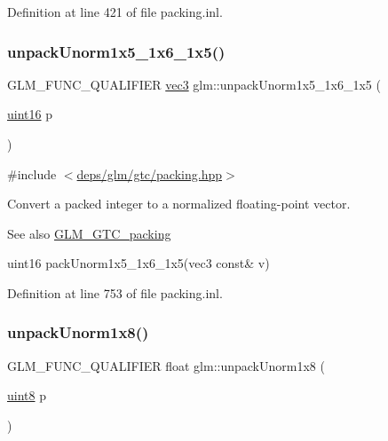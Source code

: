 Definition at line 421 of file packing.\+inl.

\mbox{\label{group__gtc__packing_ga6804d0525daf68bcac226f46fbb3b24e}} 
\subsubsection{\texorpdfstring{unpack\+Unorm1x5\+\_\+1x6\+\_\+1x5()}{unpackUnorm1x5\_1x6\_1x5()}}
{\footnotesize\ttfamily G\+L\+M\+\_\+\+F\+U\+N\+C\+\_\+\+Q\+U\+A\+L\+I\+F\+I\+ER \hyperlink{group__core__types_ga1c47e8b3386109bc992b6c48e91b0be7}{vec3} glm\+::unpack\+Unorm1x5\+\_\+1x6\+\_\+1x5 (\begin{DoxyParamCaption}\item[{\hyperlink{group__gtc__type__precision_gad8c2939e1fdd8e5828b31d95c52255d5}{uint16}}]{p }\end{DoxyParamCaption})}



{\ttfamily \#include $<$\hyperlink{gtc_2packing_8hpp}{deps/glm/gtc/packing.\+hpp}$>$}

Convert a packed integer to a normalized floating-\/point vector.

\begin{DoxySeeAlso}{See also}
\hyperlink{group__gtc__packing}{G\+L\+M\+\_\+\+G\+T\+C\+\_\+packing} 

uint16 pack\+Unorm1x5\+\_\+1x6\+\_\+1x5(vec3 const\& v) 
\end{DoxySeeAlso}


Definition at line 753 of file packing.\+inl.

\mbox{\label{group__gtc__packing_ga32f3f2642df2ea87449d59fb614a8305}} 
\subsubsection{\texorpdfstring{unpack\+Unorm1x8()}{unpackUnorm1x8()}}
{\footnotesize\ttfamily G\+L\+M\+\_\+\+F\+U\+N\+C\+\_\+\+Q\+U\+A\+L\+I\+F\+I\+ER float glm\+::unpack\+Unorm1x8 (\begin{DoxyParamCaption}\item[{\hyperlink{group__gtc__type__precision_ga1a7dcd8aac97cc8020817c94049deff2}{uint8}}]{p }\end{DoxyParamCaption})}



